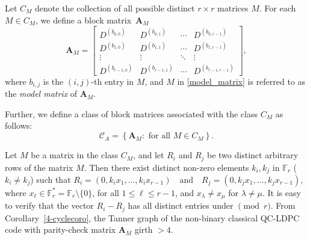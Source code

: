 \documentclass[conference]{IEEEtran}
\begin{document}
Let $C_{M}$ denote the collection of all possible distinct $r \times r$ matrices $M$. For each $M \in C_{M}$, we define a block matrix~$\mathbf{A}_{M}$
\begin{equation}\label{A}
   \mathbf{A}_{M}=
\begin{bmatrix}
D^{(b_{0,0})} & D^{(b_{0,1})} & \cdots & D^{(b_{0,r-1})} \\
D^{(b_{1,0})} & D^{(b_{1,1})} & \cdots & D^{(b_{1,r-1})} \\
\vdots        & \vdots        & \ddots & \vdots          \\
D^{(b_{r-1,0})} & D^{(b_{r-1,1})} & \cdots & D^{(b_{r-1,r-1})}
\end{bmatrix},
\end{equation}
where $b_{i,j}$ is the $(i,j)$-th entry in $M$, and 
$M$ in \eqref{model_matrix} is referred to as the \emph{model matrix} of $\mathbf{A}_{M}$. 

Further, we define a class of block matrices associated with the class $C_{M}$ as follows:
\begin{equation}\label{classCA}
    \mathcal{C}_{A} = \left\{ \mathbf{A}_{M} : \text{ for all } M \in C_{M} \right\}.
\end{equation}

Let $M$ be a matrix in the class $C_{M}$, and let $R_i$ and $R_j$ be two distinct arbitrary rows of the matrix $M$. Then there exist distinct non-zero elements $k_i, k_j$ in $\mathbb{F}_{r}$ ($k_i\neq k_j$) such that $R_i = (0, k_i x_1, \ldots, k_i x_{r-1}) \quad \text{and} \quad R_j = (0, k_j x_1, \ldots, k_j x_{r-1}),$ where $x_{\ell} \in \mathbb{F}_{r}^{*}=\mathbb{F}_{r}\setminus\{0\}$, for all $1 \leq \ell \leq r-1$, and $x_{\lambda} \neq x_{\mu}$ for $\lambda \neq \mu$. It is easy to verify that the vector $R_i - R_j$ has all distinct entries under $\pmod{r}$. From Corollary~\ref{4-cyclecoro}, the Tanner graph of the non-binary classical QC-LDPC code with parity-check matrix $\mathbf{A}_{M}$ girth $> 4$.
\end{document}
